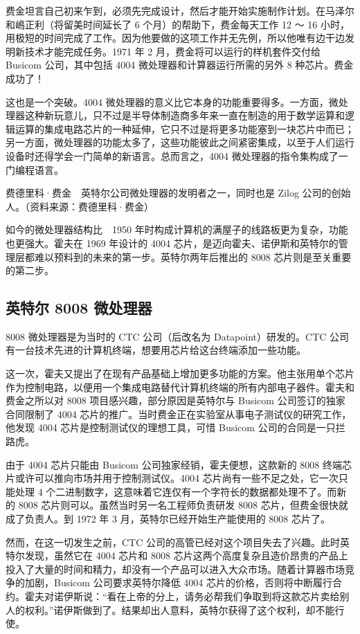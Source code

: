 \documentclass[12pt,UTF8]{ctexbook}
\begin{document}
费金坦言自己初来乍到，必须先完成设计，然后才能开始实施制作计划。在马泽尔和嶋正利（将留美时间延长了 6 个月）的帮助下，费金每天工作 12 ～ 16 小时，用极短的时间完成了工作。因为他要做的这项工作并无先例，所以他唯有边干边发明新技术才能完成任务。1971 年 2 月，费金将可以运行的样机套件交付给 Busicom 公司，其中包括 4004 微处理器和计算器运行所需的另外 8 种芯片。费金成功了！

这也是一个突破。4004 微处理器的意义比它本身的功能重要得多。一方面，微处理器这种新玩意儿，只不过是半导体制造商多年来一直在制造的用于数学运算和逻辑运算的集成电路芯片的一种延伸，它只不过是将更多功能塞到一块芯片中而已；另一方面，微处理器的功能太多了，这些功能彼此之间紧密集成，以至于人们运行设备时还得学会一门简单的新语言。总而言之，4004 微处理器的指令集构成了一门编程语言。



费德里科·费金　英特尔公司微处理器的发明者之一，同时也是 Zilog 公司的创始人。（资料来源：费德里科·费金）

如今的微处理器结构比　1950 年时构成计算机的满屋子的线路板更为复杂，功能也更强大。霍夫在 1969 年设计的 4004 芯片，是迈向霍夫、诺伊斯和英特尔的管理层都难以预料到的未来的第一步。英特尔两年后推出的 8008 芯片则是至关重要的第二步。





\subsection{英特尔 8008 微处理器}


8008 微处理器是为当时的 CTC 公司（后改名为 Datapoint）研发的。CTC 公司有一台技术先进的计算机终端，想要用芯片给这台终端添加一些功能。

这一次，霍夫又提出了在现有产品基础上增加更多功能的方案。他主张用单个芯片作为控制电路，以便用一个集成电路替代计算机终端的所有内部电子器件。霍夫和费金之所以对 8008 项目感兴趣，部分原因是英特尔与 Busicom 公司签订的独家合同限制了 4004 芯片的推广。当时费金正在实验室从事电子测试仪的研究工作，他发现 4004 芯片是控制测试仪的理想工具，可惜 Busicom 公司的合同是一只拦路虎。

由于 4004 芯片只能由 Busicom 公司独家经销，霍夫便想，这款新的 8008 终端芯片或许可以推向市场并用于控制测试仪。4004 芯片尚有一些不足之处，它一次只能处理 4 个二进制数字，这意味着它连仅有一个字符长的数据都处理不了。而新的 8008 芯片则可以。虽然当时另一名工程师负责研发 8008 芯片，但费金很快就成了负责人。到 1972 年 3 月，英特尔已经开始生产能使用的 8008 芯片了。

然而，在这一切发生之前，CTC 公司的高管已经对这个项目失去了兴趣。此时英特尔发现，虽然它在 4004 芯片和 8008 芯片这两个高度复杂且造价昂贵的产品上投入了大量的时间和精力，却没有一个产品可以进入大众市场。随着计算器市场竞争的加剧，Busicom 公司要求英特尔降低 4004 芯片的价格，否则将中断履行合约。霍夫对诺伊斯说：“看在上帝的分上，请务必帮我们争取到将这款芯片卖给别人的权利。”诺伊斯做到了。结果却出人意料，英特尔获得了这个权利，却不能行使。
\end{document}
